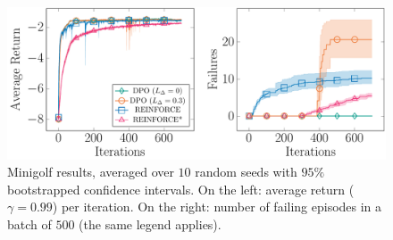 \begin{figure}[t]
	\includegraphics[width=\columnwidth]{plots/minigolf.pdf}
	\caption{Minigolf results, averaged over $10$ random seeds with $95\%$ bootstrapped confidence intervals. On the left: average return ($\gamma=0.99$) per iteration. On the right: number of failing episodes in a batch of $500$ (the same legend applies).}
	\label{fig:minigolf}
\end{figure}

